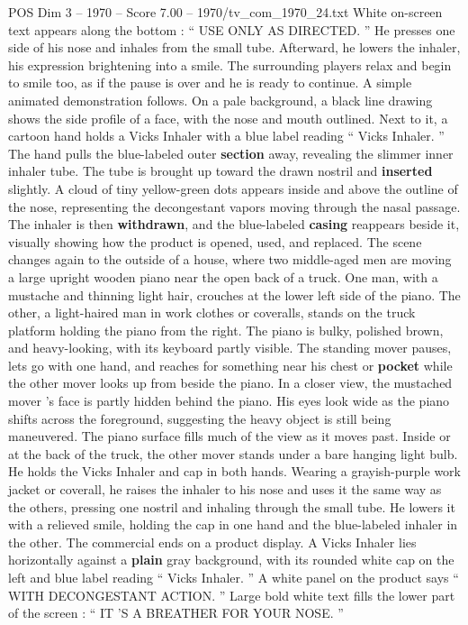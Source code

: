\begin{textsample}{POS Dim 3 – 1970 – Score 7.00 – 1970/tv\_com\_1970\_24.txt}
White on-screen text appears along the bottom : “ USE ONLY AS DIRECTED. ” He presses one side of his nose and inhales from the small tube.
Afterward, he lowers the inhaler, his expression brightening into a smile.
The surrounding players relax and begin to smile too, as if the pause is over and he is ready to continue.
A simple animated demonstration follows.
On a pale background, a black line drawing shows the side profile of a face, with the nose and mouth outlined.
Next to it, a cartoon hand holds a Vicks Inhaler with a blue label reading “ Vicks Inhaler. ” The hand pulls the blue-labeled outer \textbf{section} away, revealing the slimmer inner inhaler tube.
The tube is brought up toward the drawn nostril and \textbf{inserted} slightly.
A cloud of tiny yellow-green dots appears inside and above the outline of the nose, representing the decongestant vapors moving through the nasal passage.
The inhaler is then \textbf{withdrawn}, and the blue-labeled \textbf{casing} reappears beside it, visually showing how the product is opened, used, and replaced.
The scene changes again to the outside of a house, where two middle-aged men are moving a large upright wooden piano near the open back of a truck.
One man, with a mustache and thinning light hair, crouches at the lower left side of the piano.
The other, a light-haired man in work clothes or coveralls, stands on the truck platform holding the piano from the right.
The piano is bulky, polished brown, and heavy-looking, with its keyboard partly visible.
The standing mover pauses, lets go with one hand, and reaches for something near his chest or \textbf{pocket} while the other mover looks up from beside the piano.
In a closer view, the mustached mover ’s face is partly hidden behind the piano.
His eyes look wide as the piano shifts across the foreground, suggesting the heavy object is still being maneuvered.
The piano surface fills much of the view as it moves past.
Inside or at the back of the truck, the other mover stands under a bare hanging light bulb.
He holds the Vicks Inhaler and cap in both hands.
Wearing a grayish-purple work jacket or coverall, he raises the inhaler to his nose and uses it the same way as the others, pressing one nostril and inhaling through the small tube.
He lowers it with a relieved smile, holding the cap in one hand and the blue-labeled inhaler in the other.
The commercial ends on a product display.
A Vicks Inhaler lies horizontally against a \textbf{plain} gray background, with its rounded white cap on the left and blue label reading “ Vicks Inhaler. ” A white panel on the product says “ WITH DECONGESTANT ACTION. ” Large bold white text fills the lower part of the screen : “ IT ’S A BREATHER FOR YOUR NOSE. ”

\end{textsample}
